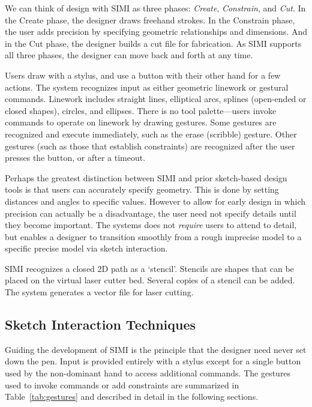 \documentclass{article}
\begin{document}
We can think of design with SIMI as three phases: \textit{Create},
\textit{Constrain}, and \textit{Cut}. In the Create phase, the
designer draws freehand strokes. In the Constrain phase, the user adds
precision by specifying geometric relationships and dimensions. And in
the Cut phase, the designer builds a cut file for fabrication. As SIMI
supports all three phases, the designer can move back and forth at any
time.

Users draw with a stylus, and use a button with their other hand for a
few actions. The system recognizes input as either geometric linework
or gestural commands. Linework includes straight lines, elliptical
arcs, splines (open-ended or closed shapes), circles, and
ellipses. There is no tool palette---users invoke commands to operate
on linework by drawing gestures. Some gestures are recognized and
execute immediately, such as the erase (scribble) gesture. Other
gestures (such as those that establish constraints) are recognized
after the user presses the button, or after a timeout.

Perhaps the greatest distinction between SIMI and prior sketch-based
design tools is that users can accurately specify geometry. This is
done by setting distances and angles to specific values. However to
allow for early design in which precision can actually be a
disadvantage, the user need not specify details until they become
important. The systems does not \textit{require} users to attend to
detail, but enables a designer to transition smoothly from a rough
imprecise model to a specific precise model via sketch interaction.

SIMI recognizes a closed 2D path as a `stencil'. Stencils are shapes
that can be placed on the virtual laser cutter bed. Several copies of
a stencil can be added. The system generates a vector file for laser
cutting. 

\subsection{Sketch Interaction Techniques}

Guiding the development of SIMI is the principle that the designer
need never set down the pen. Input is provided entirely with a stylus
except for a single button used by the non-dominant hand to access
additional commands. The gestures used to invoke commands or add
constraints are summarized in Table~\ref{tab:gestures} and described
in detail in the following sections.
\end{document}
